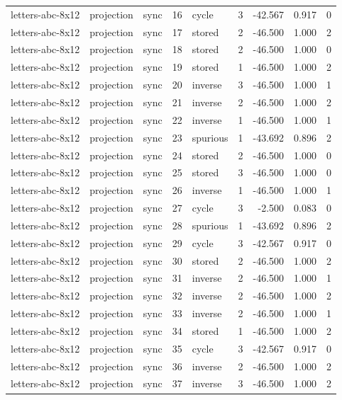 \begin{tabular}{lllrlrrrr}
letters-abc-8x12 & projection & sync & 16 & cycle & 3 & -42.567 & 0.917 & 0 \\
letters-abc-8x12 & projection & sync & 17 & stored & 2 & -46.500 & 1.000 & 2 \\
letters-abc-8x12 & projection & sync & 18 & stored & 2 & -46.500 & 1.000 & 0 \\
letters-abc-8x12 & projection & sync & 19 & stored & 1 & -46.500 & 1.000 & 2 \\
letters-abc-8x12 & projection & sync & 20 & inverse & 3 & -46.500 & 1.000 & 1 \\
letters-abc-8x12 & projection & sync & 21 & inverse & 2 & -46.500 & 1.000 & 2 \\
letters-abc-8x12 & projection & sync & 22 & inverse & 1 & -46.500 & 1.000 & 1 \\
letters-abc-8x12 & projection & sync & 23 & spurious & 1 & -43.692 & 0.896 & 2 \\
letters-abc-8x12 & projection & sync & 24 & stored & 2 & -46.500 & 1.000 & 0 \\
letters-abc-8x12 & projection & sync & 25 & stored & 3 & -46.500 & 1.000 & 0 \\
letters-abc-8x12 & projection & sync & 26 & inverse & 1 & -46.500 & 1.000 & 1 \\
letters-abc-8x12 & projection & sync & 27 & cycle & 3 & -2.500 & 0.083 & 0 \\
letters-abc-8x12 & projection & sync & 28 & spurious & 1 & -43.692 & 0.896 & 2 \\
letters-abc-8x12 & projection & sync & 29 & cycle & 3 & -42.567 & 0.917 & 0 \\
letters-abc-8x12 & projection & sync & 30 & stored & 2 & -46.500 & 1.000 & 2 \\
letters-abc-8x12 & projection & sync & 31 & inverse & 2 & -46.500 & 1.000 & 1 \\
letters-abc-8x12 & projection & sync & 32 & inverse & 2 & -46.500 & 1.000 & 2 \\
letters-abc-8x12 & projection & sync & 33 & inverse & 2 & -46.500 & 1.000 & 1 \\
letters-abc-8x12 & projection & sync & 34 & stored & 1 & -46.500 & 1.000 & 2 \\
letters-abc-8x12 & projection & sync & 35 & cycle & 3 & -42.567 & 0.917 & 0 \\
letters-abc-8x12 & projection & sync & 36 & inverse & 2 & -46.500 & 1.000 & 2 \\
letters-abc-8x12 & projection & sync & 37 & inverse & 3 & -46.500 & 1.000 & 2 \\

\end{tabular}
